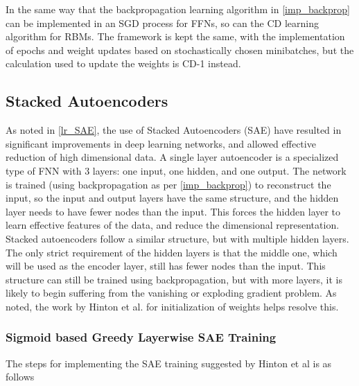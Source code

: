 \documentclass[a4paper,11pt,oneside]{article}
\theoremstyle{plain}
\theoremstyle{definition}
\begin{document}
In the same way that the backpropagation learning algorithm in \ref{imp_backprop} can be implemented in an SGD process for FFNs, so can the CD learning algorithm for RBMs. The framework is kept the same, with the implementation of epochs and weight updates based on stochastically chosen minibatches, but the calculation used to update the weights is CD-1 instead.


\subsection{Stacked Autoencoders}\label{imp_SAE}

As noted in \ref{lr_SAE}, the use of Stacked Autoencoders (SAE) have resulted in significant improvements in deep learning networks, and allowed effective reduction of high dimensional data. A single layer autoencoder is a specialized type of FNN with 3 layers: one input, one hidden, and one output. The network is trained (using backpropagation as per \ref{imp_backprop}) to reconstruct the input, so the input and output layers have the same structure, and the hidden layer needs to have fewer nodes than the input. This forces the hidden layer to learn effective features of the data, and reduce the dimensional representation. 
\newline\newline
Stacked autoencoders follow a similar structure, but with multiple hidden layers. The only strict requirement of the hidden layers is that the middle one, which will be used as the encoder layer, still has fewer nodes than the input. This structure can still be trained using backpropagation, but with more layers, it is likely to begin suffering from the vanishing or exploding gradient problem. As noted, the work by Hinton et al. for initialization of weights helps resolve this.

\subsubsection{Sigmoid based Greedy Layerwise SAE Training}\label{imp_sigmoidsae}

The steps for implementing the SAE training suggested by Hinton et al \cite{Hinton2} is as follows
\end{document}
